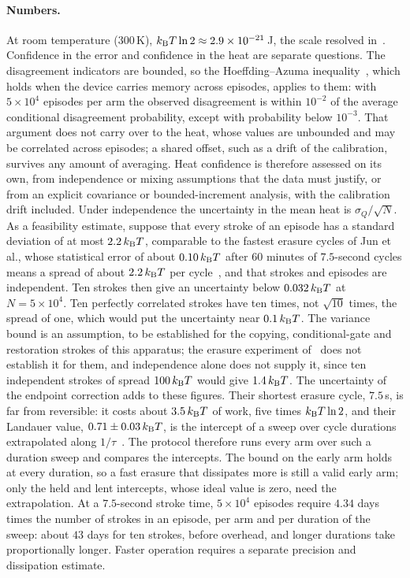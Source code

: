 \paragraph{Numbers.} At room temperature ($300$\,K), $k_{\mathrm B} T\ln2\approx2.9\times10^{-21}$\,J, the scale resolved in~\cite{Berut12,Jun14}. Confidence in the error and confidence in the heat are separate questions. The disagreement indicators are bounded, so the Hoeffding--Azuma inequality~\cite{Hoeffding63,Azuma67}, which holds when the device carries memory across episodes, applies to them: with $5\times10^4$ episodes per arm the observed disagreement is within $10^{-2}$ of the average conditional disagreement probability, except with probability below $10^{-3}$. That argument does not carry over to the heat, whose values are unbounded and may be correlated across episodes; a shared offset, such as a drift of the calibration, survives any amount of averaging. Heat confidence is therefore assessed on its own, from independence or mixing assumptions that the data must justify, or from an explicit covariance or bounded-increment analysis, with the calibration drift included. Under independence the uncertainty in the mean heat is $\sigma_Q/\sqrt N$. As a feasibility estimate, suppose that every stroke of an episode has a standard deviation of at most $2.2\,k_{\mathrm B} T$, comparable to the fastest erasure cycles of Jun et al., whose statistical error of about $0.10\,k_{\mathrm B} T$ after $60$ minutes of $7.5$-second cycles means a spread of about $2.2\,k_{\mathrm B} T$ per cycle~\cite{Jun14}, and that strokes and episodes are independent. Ten strokes then give an uncertainty below $0.032\,k_{\mathrm B} T$ at $N=5\times10^4$. Ten perfectly correlated strokes have ten times, not $\sqrt{10}$ times, the spread of one, which would put the uncertainty near $0.1\,k_{\mathrm B} T$. The variance bound is an assumption, to be established for the copying, conditional-gate and restoration strokes of this apparatus; the erasure experiment of~\cite{Jun14} does not establish it for them, and independence alone does not supply it, since ten independent strokes of spread $100\,k_{\mathrm B} T$ would give $1.4\,k_{\mathrm B} T$. The uncertainty of the endpoint correction adds to these figures. Their shortest erasure cycle, $7.5$\,s, is far from reversible: it costs about $3.5\,k_{\mathrm B} T$ of work, five times $k_{\mathrm B} T\ln2$, and their Landauer value, $0.71\pm0.03\,k_{\mathrm B} T$, is the intercept of a sweep over cycle durations extrapolated along $1/\tau$~\cite{Jun14}. The protocol therefore runs every arm over such a duration sweep and compares the intercepts. The bound on the early arm holds at every duration, so a fast erasure that dissipates more is still a valid early arm; only the held and lent intercepts, whose ideal value is zero, need the extrapolation. At a $7.5$-second stroke time, $5\times10^4$ episodes require $4.34$ days times the number of strokes in an episode, per arm and per duration of the sweep: about $43$ days for ten strokes, before overhead, and longer durations take proportionally longer. Faster operation requires a separate precision and dissipation estimate.

